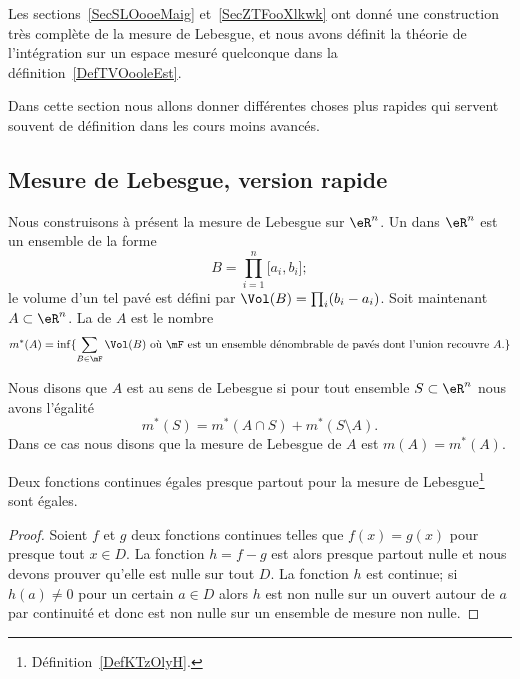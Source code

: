 Les sections~\ref{SecSLOooeMaig} et~\ref{SecZTFooXlkwk} ont donné une construction très complète de la mesure de Lebesgue, et nous avons définit la théorie de l'intégration sur un espace mesuré quelconque dans la définition~\ref{DefTVOooleEst}.

Dans cette section nous allons donner différentes choses plus rapides qui servent souvent de définition dans les cours moins avancés.

\subsection{Mesure de Lebesgue, version rapide}

Nous construisons à présent la mesure de Lebesgue sur \( \eR^n\). Un  dans \( \eR^n\) est un ensemble de la forme
\begin{equation}
    B=\prod_{i=1}^n\mathopen[ a_i , b_i \mathclose];
\end{equation}
le volume d'un tel pavé est défini par \( \Vol(B)=\prod_i(b_i-a_i)\). Soit maintenant \( A\subset \eR^n\). La  de \( A\) est le nombre
\begin{equation}
    m^*(A)=\inf\{ \sum_{B\in\mF}\Vol(B)\text{ où } \mF\text{ est un ensemble dénombrable de pavés dont l'union recouvre } A\text{.} \}
\end{equation}

\begin{definition}  \label{DefKTzOlyH}
Nous disons que \( A\) est  au sens de Lebesgue si pour tout ensemble \( S\subset \eR^n\) nous avons l'égalité
\begin{equation}
    m^*(S)=m^*(A\cap S)+m^*(S\setminus A).
\end{equation}
Dans ce cas nous disons que la mesure de Lebesgue de \( A\) est \( m(A)=m^*(A)\).
\end{definition}

\begin{proposition}     \label{PropNCMToWI}
    Deux fonctions continues égales presque partout pour la mesure de Lebesgue\footnote{Définition~\ref{DefKTzOlyH}.} sont égales.
\end{proposition}

\begin{proof}
    Soient \( f\) et \( g\) deux fonctions continues telles que \( f(x)=g(x)\) pour presque tout \( x\in D\). La fonction \( h=f-g\) est alors presque partout nulle et nous devons prouver qu'elle est nulle sur tout \( D\). La fonction \( h\) est continue; si \( h(a)\neq 0\) pour un certain \( a\in D\) alors \( h\) est non nulle sur un ouvert autour de \( a\) par continuité et donc est non nulle sur un ensemble de mesure non nulle.
\end{proof}

